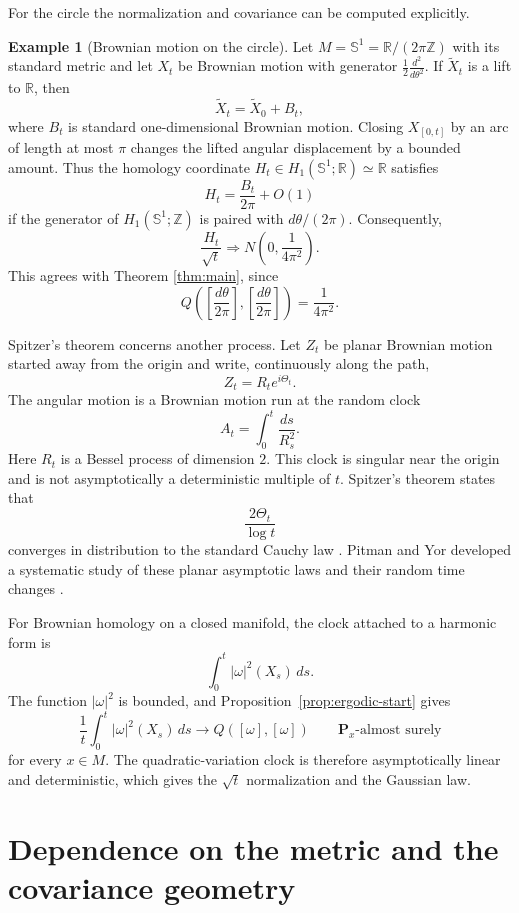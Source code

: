 \documentclass[a4paper,reqno]{amsart}
\newcommand{\R}{\mathbb R}
\newcommand{\Z}{\mathbb Z}
\newcommand{\Sph}{\mathbb S}
\newcommand{\Pp}{\mathbf P}
\theoremstyle{definition}
\newtheorem{example}[theorem]{Example}
\begin{document}
For the circle the normalization and covariance can be computed explicitly.

\begin{example}[Brownian motion on the circle]\label{ex:circle}
Let $M=\Sph^1=\R/(2\pi\Z)$ with its standard metric and let $X_t$ be Brownian motion with generator $\frac12\frac{d^2}{d\theta^2}$.  If $\widetilde X_t$ is a lift to $\R$, then
\[
   \widetilde X_t=\widetilde X_0+B_t,
\]
where $B_t$ is standard one-dimensional Brownian motion.  Closing $X_{[0,t]}$ by an arc of length at most $\pi$ changes the lifted angular displacement by a bounded amount.  Thus the homology coordinate $H_t\in H_1(\Sph^1;\R)\simeq\R$ satisfies
\[
   H_t=\frac{B_t}{2\pi}+O(1)
\]
if the generator of $H_1(\Sph^1;\Z)$ is paired with $d\theta/(2\pi)$.  Consequently,
\[
   \frac{H_t}{\sqrt t}
   \Longrightarrow
   N\left(0,\frac{1}{4\pi^2}\right).
\]
This agrees with Theorem \ref{thm:main}, since
\[
   Q\left(\left[\frac{d\theta}{2\pi}\right],
          \left[\frac{d\theta}{2\pi}\right]\right)
   =\frac{1}{4\pi^2}.
\]
\end{example}

Spitzer's theorem concerns another process.  Let $Z_t$ be planar Brownian motion started away from the origin and write, continuously along the path,
\[
   Z_t=R_t e^{i\Theta_t}.
\]
The angular motion is a Brownian motion run at the random clock
\[
   A_t=\int_0^t\frac{ds}{R_s^2}.
\]
Here $R_t$ is a Bessel process of dimension $2$.  This clock is singular near the origin and is not asymptotically a deterministic multiple of $t$.  Spitzer's theorem states that
\[
   \frac{2\Theta_t}{\log t}
\]
converges in distribution to the standard Cauchy law \cite{Spitzer}.  Pitman and Yor developed a systematic study of these planar asymptotic laws and their random time changes \cite{PitmanYor}.

For Brownian homology on a closed manifold, the clock attached to a harmonic form is
\[
   \int_0^t|\omega|^2(X_s)\,ds.
\]
The function $|\omega|^2$ is bounded, and Proposition~\ref{prop:ergodic-start} gives
\[
   \frac1t\int_0^t|\omega|^2(X_s)\,ds
   \longrightarrow Q([\omega],[\omega])
   \qquad \Pp_x\text{-almost surely}
\]
for every $x\in M$.  The quadratic-variation clock is therefore asymptotically linear and deterministic, which gives the $\sqrt t$ normalization and the Gaussian law.

\section{Dependence on the metric and the covariance geometry}
\end{document}

